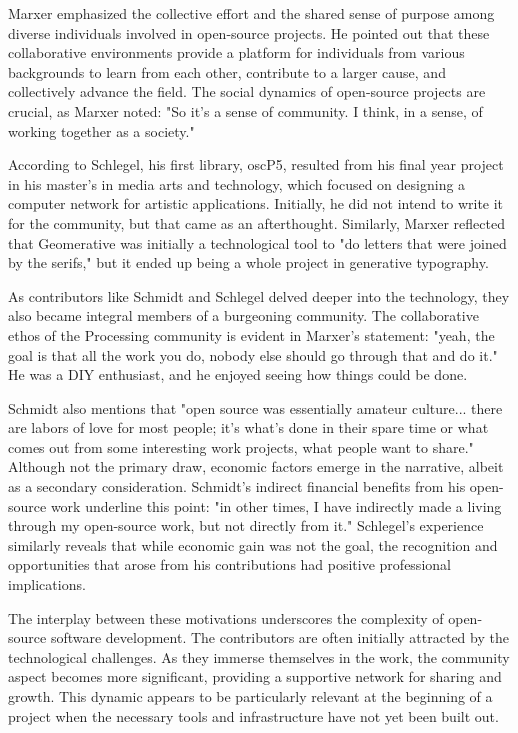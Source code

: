 Marxer emphasized the collective effort and the shared sense of purpose among diverse individuals involved in open-source projects. He pointed out that these collaborative environments provide a platform for individuals from various backgrounds to learn from each other, contribute to a larger cause, and collectively advance the field. The social dynamics of open-source projects are crucial, as Marxer noted: "So it's a sense of community. I think, in a sense, of working together as a society."

According to Schlegel, his first library, oscP5, resulted from his final year project in his master's in media arts and technology, which focused on designing a computer network for artistic applications. Initially, he did not intend to write it for the community, but that came as an afterthought. Similarly, Marxer reflected that Geomerative was initially a technological tool to "do letters that were joined by the serifs," but it ended up being a whole project in generative typography.

As contributors like Schmidt and Schlegel delved deeper into the technology, they also became integral members of a burgeoning community. The collaborative ethos of the Processing community is evident in Marxer's statement: "yeah, the goal is that all the work you do, nobody else should go through that and do it." He was a DIY enthusiast, and he enjoyed seeing how things could be done. 

Schmidt also mentions that "open source was essentially amateur culture... there are labors of love for most people; it's what's done in their spare time or what comes out from some interesting work projects, what people want to share." Although not the primary draw, economic factors emerge in the narrative, albeit as a secondary consideration. Schmidt's indirect financial benefits from his open-source work underline this point: "in other times, I have indirectly made a living through my open-source work, but not directly from it." Schlegel's experience similarly reveals that while economic gain was not the goal, the recognition and opportunities that arose from his contributions had positive professional implications.

The interplay between these motivations underscores the complexity of open-source software development. The contributors are often initially attracted by the technological challenges. As they immerse themselves in the work, the community aspect becomes more significant, providing a supportive network for sharing and growth. This dynamic appears to be particularly relevant at the beginning of a project when the necessary tools and infrastructure have not yet been built out.


